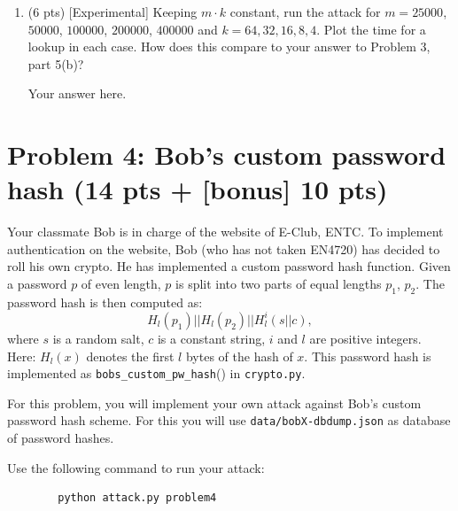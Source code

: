 \documentclass[11pt,letterpaper]{article}
\newenvironment{answer}{\em \color{blue} \begin{adjustwidth}{1cm}{1cm}}{\end{adjustwidth}}
\begin{document}
\begin{enumerate}
\begin{enumerate}
\begin{answer}
				
			\end{answer}
			
		\end{enumerate}
		
		\item (6 pts) [Experimental] Keeping $m \cdot k$ constant, run the attack for $m = 25000$, $50000$, $100000$, $200000$, $400000$ and $k = 64, 32, 16, 8, 4$. Plot the time for a lookup in each case. How does this compare to your answer to Problem 3, part 5(b)?
		
		\begin{answer}
			
			
			Your answer here.
			
		\end{answer}
		
	\end{enumerate}
	
	\newpage
	
	\section*{Problem 4: Bob's custom password hash (14 pts + [bonus] 10 pts)}
	
	Your classmate Bob is in charge of the website of E-Club, ENTC. To implement authentication on the website, Bob (who has not taken EN4720) has decided to roll his own crypto. He has implemented a custom password hash function. Given a password $p$ of even length, $p$ is split into two parts of equal lengths $p_1$, $p_2$. The password hash is then computed as:
	\[ H_l(p_1) || H_l(p_2) || H_l^i(s || c) , \]
	where $s$ is a random salt, $c$ is a constant string, $i$ and $l$ are positive integers. Here: $H_l(x)$ denotes the first $l$ bytes of the hash of $x$. This password hash is implemented as \texttt{bobs\_custom\_pw\_hash}() in \texttt{crypto.py}.
	
	
	For this problem, you will implement your own attack against Bob's custom password hash scheme. For this you will use \texttt{data/bobX-dbdump.json} as database of password hashes.
	
	Use the following command to run your attack:
	\begin{Verbatim}
		python attack.py problem4
	\end{Verbatim}
	
\end{document}
